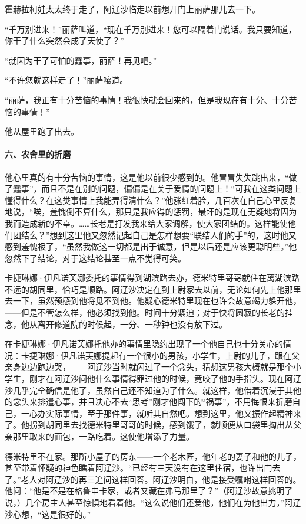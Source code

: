 \par 霍赫拉柯娃太太终于走了，阿辽沙临走以前想开门上丽萨那儿去一下。
\par “千万别进来！”丽萨叫道，“现在千万别进来！您可以隔着门说话。我只要知道，你干了什么突然会成了天使了？”
\par “就因为干了可怕的蠢事，丽萨！再见吧。”
\par “不许您就这样走了！”丽萨嚷道。
\par “丽萨，我正有十分苦恼的事情！我很快就会回来的，但是我现在有十分、十分苦恼的事情！”
\par 他从屋里跑了出去。
\paragraph*{六、农舍里的折磨}
\par 他心里真的有十分苦恼的事情，这是他以前很少感到的。他冒冒失失跳出来，“做了蠢事”，而且不是在别的问题，偏偏是在关于爱情的问题上！“可我在这类问题上懂得什么？在这类事情上我能弄得清什么？”他涨红着脸，几百次在自己心里反复地说，“唉，羞愧倒不算什么，那只是我应得的惩罚，最坏的是现在无疑地将因为我而造成新的不幸。……长老是打发我来给大家调解，使大家团结的。这样能使他们团结么？”想到这里他又忽然记起自己是怎样想要“联结人们的手”的，这时他又感到羞愧极了，“虽然我做这一切都是出于诚意，但是以后还是应该更聪明些。”他忽然下了结论，对于这结论甚至一点不觉得可笑。
\par 卡捷琳娜·伊凡诺芙娜委托的事情得到湖滨路去办，德米特里哥哥就住在离湖滨路不远的胡同里，恰巧是顺路。阿辽沙决定在到上尉家去以前，无论如何先上他那里去一下，虽然预感到他将见不到他。他疑心德米特里现在也许会故意竭力躲开他，——但是不管怎么样，他必须找到他。时间十分紧迫；对于快将圆寂的长老的挂念，他从离开修道院的时候起，一分、一秒钟也没有放下过。
\par 在卡捷琳娜·伊凡诺芙娜托他办的事情里隐约出现了一个他自己也十分关心的情况：卡捷琳娜·伊凡诺芙娜提起有一个很小的男孩，小学生，上尉的儿子，跟在父亲身边边跑边哭，——阿辽沙当时就闪过了一个念头，猜想这男孩大概就是那个小学生，刚才在阿辽沙问他什么事情得罪过他的时候，竟咬了他的手指头。现在阿辽沙几乎完全确信是他了，虽然自己还不知道为了什么。就这样，他借着沉浸于其他的念头来排遣心事，并且决心不去“思考”刚才他闯下的“祸事”，不用悔恨来折磨自己，一心办实际事情，至于那件事，就听其自然吧。想到这里，他又振作起精神来了。他拐到胡同里去找德米特里哥哥的时候，感到饿了，就顺便从口袋里掏出从父亲那里取来的面包，一路吃着。这使他增添了力量。
\par 德米特里不在家。那所小屋子的房东——一个老木匠，他年老的妻子和他的儿子，甚至带着怀疑的神色瞧着阿辽沙。“已经有三天没有在这里住宿，也许出门去了。”老人对阿辽沙的再三追问这样回答。阿辽沙明白，他是接受嘱咐这样回答的。他问：“他是不是在格鲁申卡家，或者又藏在弗马那里了？”（阿辽沙故意挑明了说，）几个房主人甚至惊惧地看着他。“这么说他们还爱他，他们在为他出力，”阿辽沙心想，“这是很好的。”
